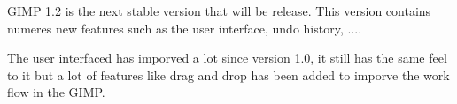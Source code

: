 GIMP 1.2 is the next stable version that will be release. This version contains numeres new features such as the user interface, undo history, .... 

The user interfaced has imporved a lot since version 1.0, it still has the same feel to it but a lot of features like drag and drop has been added to imporve the work flow in the GIMP. 
